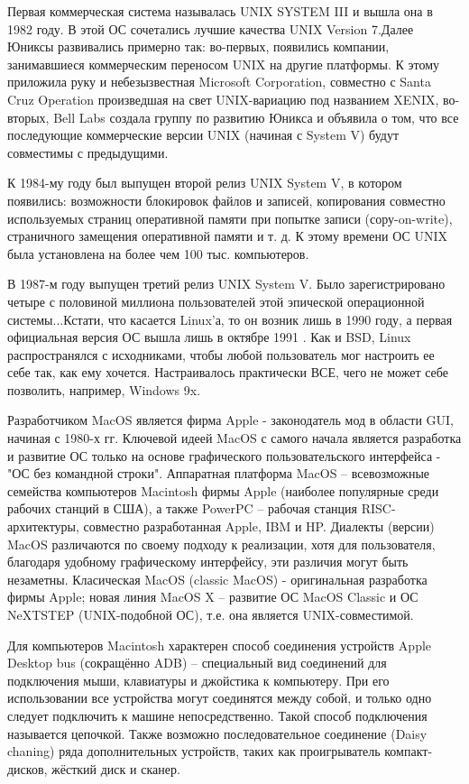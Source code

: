Первая коммерческая система называлась UNIX SYSTEM III и вышла она в 1982 году. В этой ОС сочетались лучшие качества UNIX Version 7.Далее Юниксы развивались примерно так: во-первых, появились компании, занимавшиеся коммерческим переносом UNIX на другие платформы. К этому приложила руку и небезызвестная Microsoft Corporation, совместно с Santa Cruz Operation произведшая на свет UNIX-вариацию под названием XENIX, во-вторых, Bell Labs создала группу по развитию Юникса и объявила о том, что все последующие коммерческие версии UNIX (начиная с System V) будут совместимы с предыдущими.

К 1984-му году был выпущен второй релиз UNIX System V, в котором появились: возможности блокировок файлов и записей, копирования совместно используемых страниц оперативной памяти при попытке записи (сору-on-write), страничного замещения оперативной памяти и т. д. К этому времени ОС UNIX была установлена на более чем 100 тыс. компьютеров.

В 1987-м году выпущен третий релиз UNIX System V. Было зарегистрировано четыре с половиной миллиона пользователей этой эпической операционной системы...Кстати, что касается Linux’а, то он возник лишь в 1990 году, а первая официальная версия ОС вышла лишь в октябре 1991 . Как и BSD, Linux распространялся с исходниками, чтобы любой пользователь мог настроить ее себе так, как ему хочется. Настраивалось практически ВСЕ, чего не может себе позволить, например, Windows 9x.


Разработчиком MacOS является фирма Apple - законодатель мод в области GUI, начиная с 1980-х гг. Ключевой идеей MacOS с самого начала является разработка и развитие ОС только на основе графического пользовательского интерфейса - "ОС без командной строки". Аппаратная платформа MacOS – всевозможные семейства компьютеров Macintosh фирмы Apple (наиболее популярные среди рабочих станций в США), а также PowerPC – рабочая станция RISC-архитектуры, совместно разработанная Apple, IBM и HP. Диалекты (версии) MacOS различаются по своему подходу к реализации, хотя для пользователя, благодаря удобному графическому интерфейсу, эти различия могут быть незаметны. Класическая MacOS (classic MacOS) - оригинальная разработка фирмы Apple; новая линия MacOS X – развитие ОС MacOS Classic и ОС NeXTSTEP (UNIX-подобной ОС), т.е. она является UNIX-совместимой.

Для компьютеров Macintosh характерен способ соединения устройств Apple Desktop bus (сокращённо ADB) – специальный вид соединений для подключения мыши, клавиатуры и джойстика к компьютеру. При его использовании все устройства могут соединятся между собой, и только одно следует подключить к машине непосредственно. Такой способ подключения называется цепочкой. Также возможно последовательное соединение (Daisy chaning) ряда дополнительных устройств, таких как проигрыватель компакт-дисков, жёсткий диск и сканер.

